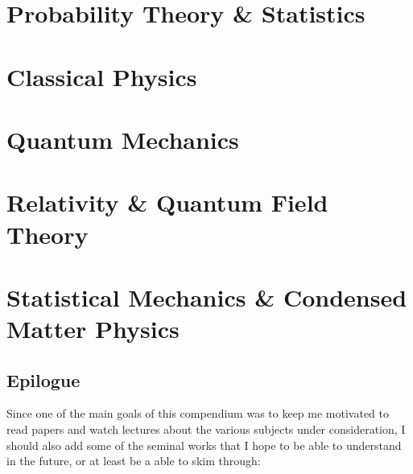 \documentclass[11pt, a4paper]{report}
\begin{document}
\part{Probability Theory \& Statistics}






\part{Classical Physics}








\part{Quantum Mechanics}









\part{Relativity \& Quantum Field Theory}










\part{Statistical Mechanics \& Condensed Matter Physics}





\chapter{Epilogue}

    Since one of the main goals of this compendium was to keep me motivated to read papers and watch lectures about the various subjects under consideration, I should also add some of the seminal works that I hope to be able to understand  in the future, or at least be a able to skim through:
\end{document}
